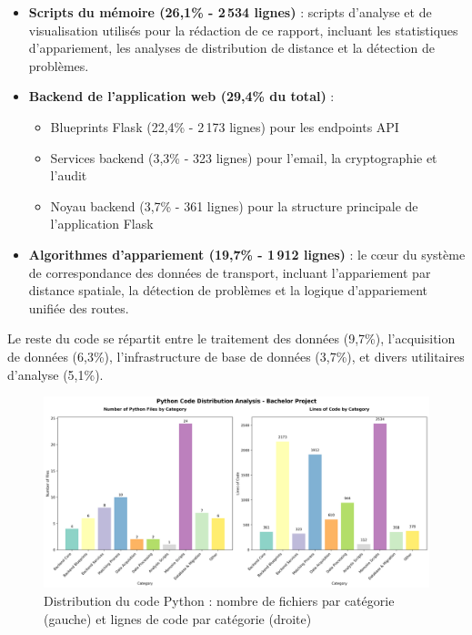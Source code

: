 \begin{itemize}
\item \textbf{Scripts du mémoire (26,1\% - 2\,534 lignes)} : scripts d'analyse et de visualisation utilisés pour la rédaction de ce rapport, incluant les statistiques d'appariement, les analyses de distribution de distance et la détection de problèmes.

\item \textbf{Backend de l'application web (29,4\% du total)} : 
\begin{itemize}
\item Blueprints Flask (22,4\% - 2\,173 lignes) pour les endpoints API
\item Services backend (3,3\% - 323 lignes) pour l'email, la cryptographie et l'audit
\item Noyau backend (3,7\% - 361 lignes) pour la structure principale de l'application Flask
\end{itemize}

\item \textbf{Algorithmes d'appariement (19,7\% - 1\,912 lignes)} : le cœur du système de correspondance des données de transport, incluant l'appariement par distance spatiale, la détection de problèmes et la logique d'appariement unifiée des routes.
\end{itemize}

Le reste du code se répartit entre le traitement des données (9,7\%), l'acquisition de données (6,3\%), l'infrastructure de base de données (3,7\%), et divers utilitaires d'analyse (5,1\%).

\begin{figure}[h]
\centering
\includegraphics[width=\textwidth]{figures/conclusion/python_distribution_analysis.png}
\caption{Distribution du code Python : nombre de fichiers par catégorie (gauche) et lignes de code par catégorie (droite)}
\label{fig:python_distribution}
\end{figure}


